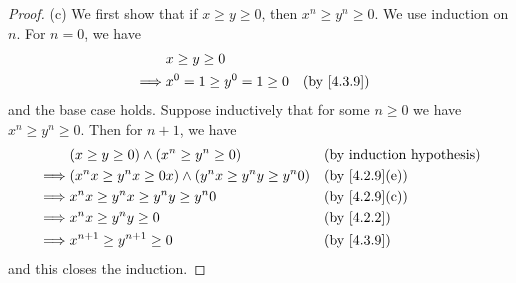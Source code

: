 \begin{proof}{(c)}
  We first show that if \(x \geq y \geq 0\), then \(x^n \geq y^n \geq 0\).
  We use induction on \(n\).
  For \(n = 0\), we have
  \begin{align*}
             & x \geq y \geq 0                             \\
    \implies & x^0 = 1 \geq y^0 = 1 \geq 0 &  & \by{4.3.9}
  \end{align*}
  and the base case holds.
  Suppose inductively that for some \(n \geq 0\) we have \(x^n \geq y^n \geq 0\).
  Then for \(n + 1\), we have
  \begin{align*}
             & (x \geq y \geq 0) \land (x^n \geq y^n \geq 0)                  &  & \byIH                       \\
    \implies & (x^n x \geq y^n x \geq 0x) \land (y^n x \geq y^n y \geq y^n 0) &  & \text{(by \cref{4.2.9}(e))} \\
    \implies & x^n x \geq y^n x \geq y^n y \geq y^n 0                         &  & \text{(by \cref{4.2.9}(c))} \\
    \implies & x^n x \geq y^n y \geq 0                                        &  & \by{4.2.2}                  \\
    \implies & x^{n + 1} \geq y^{n + 1} \geq 0                                &  & \by{4.3.9}
  \end{align*}
  and this closes the induction.


\end{proof}
